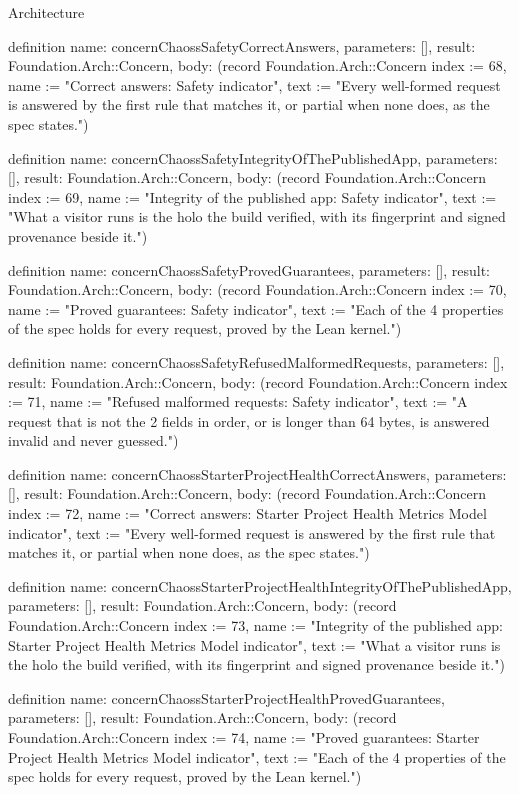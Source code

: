 \begin{lexlean}{Architecture}
\begin{semanticmodule}
definition{
  name: concernChaossSafetyCorrectAnswers,
  parameters: [],
  result: Foundation.Arch::Concern,
  body: (record Foundation.Arch::Concern {index := 68, name := "Correct answers: Safety indicator", text := "Every well-formed request is answered by the first rule that matches it, or partial when none does, as the spec states."})
}

definition{
  name: concernChaossSafetyIntegrityOfThePublishedApp,
  parameters: [],
  result: Foundation.Arch::Concern,
  body: (record Foundation.Arch::Concern {index := 69, name := "Integrity of the published app: Safety indicator", text := "What a visitor runs is the holo the build verified, with its fingerprint and signed provenance beside it."})
}

definition{
  name: concernChaossSafetyProvedGuarantees,
  parameters: [],
  result: Foundation.Arch::Concern,
  body: (record Foundation.Arch::Concern {index := 70, name := "Proved guarantees: Safety indicator", text := "Each of the 4 properties of the spec holds for every request, proved by the Lean kernel."})
}

definition{
  name: concernChaossSafetyRefusedMalformedRequests,
  parameters: [],
  result: Foundation.Arch::Concern,
  body: (record Foundation.Arch::Concern {index := 71, name := "Refused malformed requests: Safety indicator", text := "A request that is not the 2 fields in order, or is longer than 64 bytes, is answered invalid and never guessed."})
}

definition{
  name: concernChaossStarterProjectHealthCorrectAnswers,
  parameters: [],
  result: Foundation.Arch::Concern,
  body: (record Foundation.Arch::Concern {index := 72, name := "Correct answers: Starter Project Health Metrics Model indicator", text := "Every well-formed request is answered by the first rule that matches it, or partial when none does, as the spec states."})
}

definition{
  name: concernChaossStarterProjectHealthIntegrityOfThePublishedApp,
  parameters: [],
  result: Foundation.Arch::Concern,
  body: (record Foundation.Arch::Concern {index := 73, name := "Integrity of the published app: Starter Project Health Metrics Model indicator", text := "What a visitor runs is the holo the build verified, with its fingerprint and signed provenance beside it."})
}

definition{
  name: concernChaossStarterProjectHealthProvedGuarantees,
  parameters: [],
  result: Foundation.Arch::Concern,
  body: (record Foundation.Arch::Concern {index := 74, name := "Proved guarantees: Starter Project Health Metrics Model indicator", text := "Each of the 4 properties of the spec holds for every request, proved by the Lean kernel."})
}


\end{semanticmodule}
\end{lexlean}

